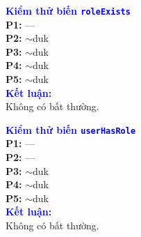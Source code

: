 \documentclass[11pt,a4paper]{article}
\begin{document}
\vspace{4pt}
\noindent
\begin{minipage}[t]{0.485\textwidth}
\begin{tcolorbox}[colback=white, colframe=darkblue!35, boxrule=0.6pt, arc=2pt, left=4pt, right=4pt, top=4pt, bottom=4pt]
\begin{minipage}[t]{0.43\linewidth}
\scriptsize
\textbf{\textcolor{blue}{Kiểm thử biến \texttt{roleExists}}}\\[4pt]
\textbf{P1:} ---\\
\textbf{P2:} $\sim$duk\\
\textbf{P3:} $\sim$duk\\
\textbf{P4:} $\sim$duk\\
\textbf{P5:} $\sim$duk\\[6pt]
\textbf{\textcolor{blue}{Kết luận:}}\\
Không có bất thường.
\end{minipage}\hfill
\begin{minipage}[t]{0.55\linewidth}
\centering
\def\lblStart{}%
\def\lblAone{}%
\def\lblAtwo{}%
\def\lblAthree{}%
\def\lblAfour{d(role\\Exists)}%
\def\lblAfive{u(role\\Exists)}%
\def\lblAsix{}%
\def\lblAseven{}%
\def\lblAeight{}%
\def\lblAnine{}%
\def\lblAten{}%
\def\lblAeleven{}%
\def\lblAtwelve{}%
\def\lblAthirteen{}%
\def\lblAfourteen{}%
\resizebox{\linewidth}{!}{\DrawAssignRoleVarDFG}
\end{minipage}
\end{tcolorbox}
\end{minipage}\hfill
\begin{minipage}[t]{0.485\textwidth}
\begin{tcolorbox}[colback=white, colframe=darkblue!35, boxrule=0.6pt, arc=2pt, left=4pt, right=4pt, top=4pt, bottom=4pt]
\begin{minipage}[t]{0.43\linewidth}
\scriptsize
\textbf{\textcolor{blue}{Kiểm thử biến \texttt{userHasRole}}}\\[4pt]
\textbf{P1:} ---\\
\textbf{P2:} ---\\
\textbf{P3:} $\sim$duk\\
\textbf{P4:} $\sim$duk\\
\textbf{P5:} $\sim$duk\\[6pt]
\textbf{\textcolor{blue}{Kết luận:}}\\
Không có bất thường.
\end{minipage}\hfill
\begin{minipage}[t]{0.55\linewidth}
\centering
\def\lblStart{}%
\def\lblAone{}%
\def\lblAtwo{}%
\def\lblAthree{}%
\def\lblAfour{}%
\def\lblAfive{}%
\def\lblAsix{}%
\def\lblAseven{d(user\\HasRole)}%
\def\lblAeight{u(user\\HasRole)}%
\def\lblAnine{}%
\def\lblAten{}%
\def\lblAeleven{}%
\def\lblAtwelve{}%
\def\lblAthirteen{}%
\def\lblAfourteen{}%
\resizebox{\linewidth}{!}{\DrawAssignRoleVarDFG}
\end{minipage}
\end{tcolorbox}
\end{minipage}
\end{document}
